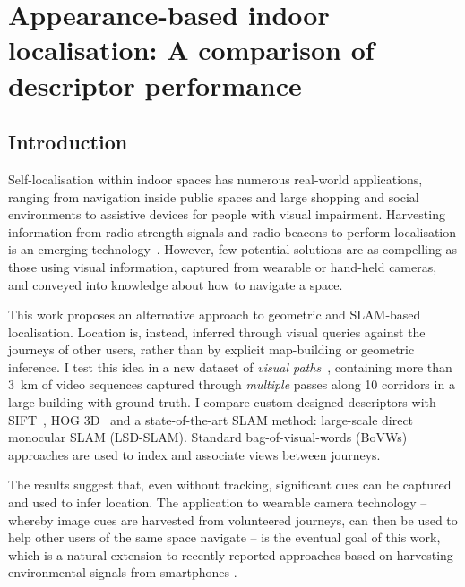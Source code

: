 \chapter{Appearance-based indoor localisation: A comparison of descriptor performance}\label{ch:chapter4} 

\section{Introduction}
\label{sec:intro}

Self-localisation within indoor spaces has numerous real-world applications, ranging from navigation inside public spaces and large shopping and social environments to assistive devices for people with visual impairment.   Harvesting information from radio-strength signals and radio beacons to perform localisation is an emerging technology~\cite{wang2012no,fallah2013indoor}.  However, few potential solutions are as compelling as those using  visual information,  captured from wearable or hand-held cameras, and conveyed into knowledge about how to navigate a space. 

This work proposes an alternative approach to geometric and SLAM-based localisation.  Location is, instead, inferred through visual queries against the journeys of other users, rather than by explicit map-building or geometric inference. 
I test this idea  in a new dataset of \emph{visual paths}~\cite{Rivera-RubioRSM}, containing  more than \SI{3}{km} of video sequences captured through {\em multiple} passes along 10 corridors  in a large building with ground truth. I compare custom-designed descriptors  with SIFT~\cite{Lowe2004}, HOG 3D~\cite{Klaser2008} and a state-of-the-art SLAM method: large-scale direct monocular SLAM (LSD-SLAM).  Standard bag-of-visual-words (BoVWs) a\-pproach\-es are used to index and associate views between journeys. 

The results suggest that, even without tracking, significant cues can be captured and used to infer location.  The application to wearable camera technology -- whereby image cues are harvested from volunteered journeys, can then be used to help other users of the same space navigate -- is the eventual goal of this work, which is a natural extension to recently reported approaches based on harvesting environmental signals from smartphones \cite{Wang2012}.



